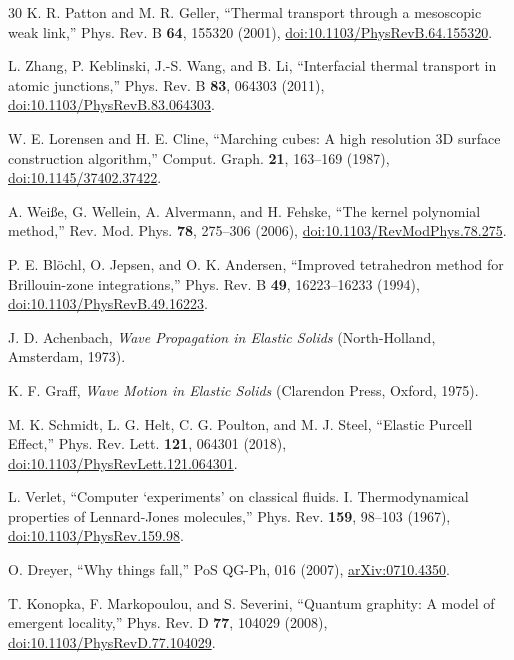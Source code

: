 \documentclass[10pt,aps,onecolumn,floatfix,notitlepage,nofootinbib,showkeys]{revtex4-2}
\begin{document}
\begin{thebibliography}{30}
K. R. Patton and M. R. Geller,
``Thermal transport through a mesoscopic weak link,''
Phys. Rev. B \textbf{64}, 155320 (2001),
\href{https://doi.org/10.1103/PhysRevB.64.155320}{doi:10.1103/PhysRevB.64.155320}.

L. Zhang, P. Keblinski, J.-S. Wang, and B. Li,
``Interfacial thermal transport in atomic junctions,''
Phys. Rev. B \textbf{83}, 064303 (2011),
\href{https://doi.org/10.1103/PhysRevB.83.064303}{doi:10.1103/PhysRevB.83.064303}.

W. E. Lorensen and H. E. Cline,
``Marching cubes: A high resolution 3D surface construction algorithm,''
Comput. Graph. \textbf{21}, 163--169 (1987),
\href{https://doi.org/10.1145/37402.37422}{doi:10.1145/37402.37422}.

A. Wei\ss{}e, G. Wellein, A. Alvermann, and H. Fehske,
``The kernel polynomial method,''
Rev. Mod. Phys. \textbf{78}, 275--306 (2006),
\href{https://doi.org/10.1103/RevModPhys.78.275}{doi:10.1103/RevModPhys.78.275}.

P. E. Bl\"ochl, O. Jepsen, and O. K. Andersen,
``Improved tetrahedron method for Brillouin-zone integrations,''
Phys. Rev. B \textbf{49}, 16223--16233 (1994),
\href{https://doi.org/10.1103/PhysRevB.49.16223}{doi:10.1103/PhysRevB.49.16223}.

J. D. Achenbach,
\textit{Wave Propagation in Elastic Solids}
(North-Holland, Amsterdam, 1973).

K. F. Graff,
\textit{Wave Motion in Elastic Solids}
(Clarendon Press, Oxford, 1975).

M. K. Schmidt, L. G. Helt, C. G. Poulton, and M. J. Steel,
``Elastic Purcell Effect,''
Phys. Rev. Lett. \textbf{121}, 064301 (2018),
\href{https://doi.org/10.1103/PhysRevLett.121.064301}{doi:10.1103/PhysRevLett.121.064301}.

L. Verlet,
``Computer `experiments' on classical fluids. I. Thermodynamical properties of Lennard-Jones molecules,''
Phys. Rev. \textbf{159}, 98--103 (1967),
\href{https://doi.org/10.1103/PhysRev.159.98}{doi:10.1103/PhysRev.159.98}.

O. Dreyer,
``Why things fall,''
PoS QG-Ph, 016 (2007),
\href{https://arxiv.org/abs/0710.4350}{arXiv:0710.4350}.

T. Konopka, F. Markopoulou, and S. Severini,
``Quantum graphity: A model of emergent locality,''
Phys. Rev. D \textbf{77}, 104029 (2008),
\href{https://doi.org/10.1103/PhysRevD.77.104029}{doi:10.1103/PhysRevD.77.104029}.


\end{thebibliography}
\end{document}
